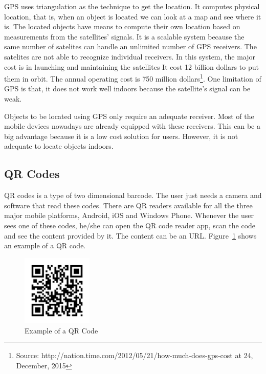 \gls{GPS} uses triangulation as the technique to get the location.
It computes physical location, that is, when an object is located we can look at a map and see where it is.
The located objects have means to compute their own location based on measurements from the satellites' signals.
It is a scalable system because the same number of satelites can handle an unlimited number of \gls{GPS} receivers.
The satelites are not able to recognize individual receivers.
In this system, the major cost is in launching and maintaining the satellites
It cost 12 billion dollars to put them in orbit. The annual operating cost is 750 million dollars\footnote{Source: http://nation.time.com/2012/05/21/how-much-does-gps-cost at 24, December, 2015}.
One limitation of \gls{GPS} is that, it does not work well indoors because the satellite's signal can be weak.

Objects to be located using \gls{GPS} only require an adequate receiver. Most of the mobile devices nowadays are already equipped with these receivers.
This can be a big advantage because it is a low cost solution for users.
However, it is not adequate to locate objects indoors.

\subsection{QR Codes}
\label{sub:background_qr_codes}
\gls{QR} codes is a type of two dimensional barcode.
The user just needs a camera and software that read these codes.
There are \gls{QR} readers available for all the three major mobile platforms, Android, iOS and Windows Phone.
Whenever the user sees one of these codes, he/she can open the \gls{QR} code reader app, scan the code and see the content provided by it.
The content can be an \gls{URL}.
Figure~\ref{fig:qr_code} shows an example of a \gls{QR} code.

\begin{figure}[!ht]
  \centering
    \includegraphics[width=0.3\textwidth, keepaspectratio]{images/qr_code}
    \caption{Example of a QR Code}
    \label{fig:qr_code}
\end{figure}


